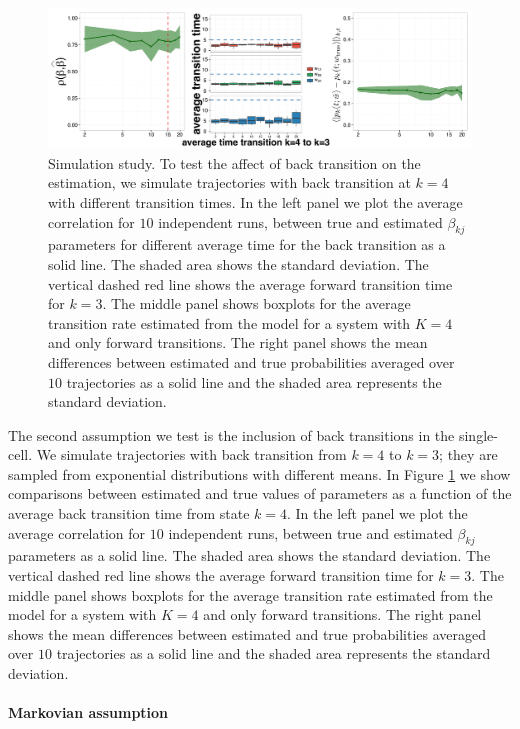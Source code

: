 \begin{figure}
  \centering \includegraphics[width=1\textwidth]{pics/back-trans.pdf}
  \caption{Simulation study. To test the affect of back transition on the estimation, we simulate trajectories with back transition at $k=4$ with different transition times. In the left panel we plot the average correlation for $10$ independent runs, between true and estimated $\beta_{kj}$ parameters for different average time for the back transition as a solid line. The shaded area shows the standard deviation. The vertical dashed red line shows the average forward transition time for $k=3$. The middle panel shows boxplots for the average transition rate estimated from the model for a system with $K=4$ and only forward transitions. The right panel shows the mean differences between estimated and true probabilities averaged over $10$ trajectories as a solid line and the shaded area represents the standard deviation.}
    \label{fig:back}
\end{figure}


The second assumption we test is the inclusion of back transitions in the single-cell. We simulate trajectories with back transition from $k=4$ to $k=3$; they are sampled from exponential distributions with different means. In Figure \ref{fig:back} we show comparisons between estimated and true values of parameters as a function of the average back transition time from state $k=4$. In the left panel we plot the average correlation for $10$ independent runs, between true and estimated $\beta_{kj}$ parameters as a solid line. The shaded area shows the standard deviation. The vertical dashed red line shows the average forward transition time for $k=3$. The middle panel shows boxplots for the average transition rate estimated from the model for a system with $K=4$ and only forward transitions. The right panel shows the mean differences between estimated and true probabilities averaged over $10$ trajectories as a solid line and the shaded area represents the standard deviation.

\paragraph{Markovian assumption}
\label{sec:stud-t-distr}


